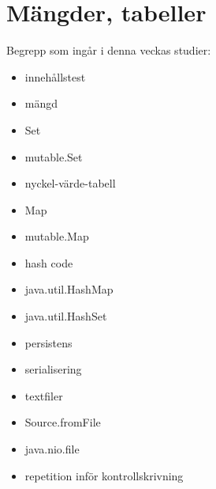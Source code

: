 \chapter{Mängder, tabeller}\label{chapter:W09}
Begrepp som ingår i denna veckas studier:
\begin{itemize}[noitemsep,label={$\square$},leftmargin=*]
\item innehållstest
\item mängd
\item Set
\item mutable.Set
\item nyckel-värde-tabell
\item Map
\item mutable.Map
\item hash code
\item java.util.HashMap
\item java.util.HashSet
\item persistens
\item serialisering
\item textfiler
\item Source.fromFile
\item java.nio.file
\item repetition inför kontrollskrivning\end{itemize}
